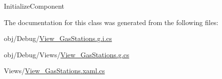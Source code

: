 Initialize\+Component 



The documentation for this class was generated from the following files\+:\begin{DoxyCompactItemize}
\item 
obj/\+Debug/\mbox{\hyperlink{_view___gas_stations_8g_8i_8cs}{View\+\_\+\+Gas\+Stations.\+g.\+i.\+cs}}\item 
obj/\+Debug/\+Views/\mbox{\hyperlink{_view___gas_stations_8g_8cs}{View\+\_\+\+Gas\+Stations.\+g.\+cs}}\item 
Views/\mbox{\hyperlink{_view___gas_stations_8xaml_8cs}{View\+\_\+\+Gas\+Stations.\+xaml.\+cs}}\end{DoxyCompactItemize}
